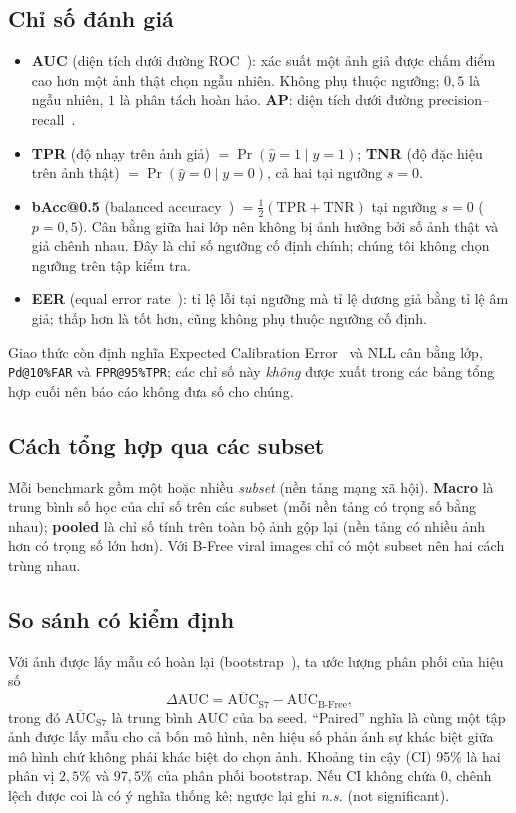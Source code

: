 \documentclass[11pt,a4paper]{article}
\begin{document}
\subsection{Chỉ số đánh giá}
\begin{itemize}
  \item \textbf{AUC} (diện tích dưới đường ROC~\cite{hanley1982meaning}): xác suất một ảnh giả được chấm điểm cao hơn một ảnh thật chọn ngẫu nhiên. Không phụ thuộc ngưỡng; $0{,}5$ là ngẫu nhiên, $1$ là phân tách hoàn hảo. \textbf{AP}: diện tích dưới đường precision--recall~\cite{davis2006relationship}.
  \item \textbf{TPR} (độ nhạy trên ảnh giả) $=\Pr(\hat y=1\mid y=1)$; \textbf{TNR} (độ đặc hiệu trên ảnh thật) $=\Pr(\hat y=0\mid y=0)$, cả hai tại ngưỡng $s=0$.
  \item \textbf{bAcc@0.5} (balanced accuracy~\cite{brodersen2010balanced}) $=\tfrac12(\text{TPR}+\text{TNR})$ tại ngưỡng $s=0$ ($p=0{,}5$). Cân bằng giữa hai lớp nên không bị ảnh hưởng bởi số ảnh thật và giả chênh nhau. Đây là chỉ số ngưỡng cố định chính; chúng tôi không chọn ngưỡng trên tập kiểm tra.
  \item \textbf{EER} (equal error rate~\cite{ross2003information}): tỉ lệ lỗi tại ngưỡng mà tỉ lệ dương giả bằng tỉ lệ âm giả; thấp hơn là tốt hơn, cũng không phụ thuộc ngưỡng cố định.
\end{itemize}
Giao thức còn định nghĩa Expected Calibration Error~\cite{guo2017calibration} và NLL cân bằng lớp, \texttt{Pd@10\%FAR} và \texttt{FPR@95\%TPR}; các chỉ số này \emph{không} được xuất trong các bảng tổng hợp cuối nên báo cáo không đưa số cho chúng.

\subsection{Cách tổng hợp qua các subset}
Mỗi benchmark gồm một hoặc nhiều \emph{subset} (nền tảng mạng xã hội). \textbf{Macro} là trung bình số học của chỉ số trên các subset (mỗi nền tảng có trọng số bằng nhau); \textbf{pooled} là chỉ số tính trên toàn bộ ảnh gộp lại (nền tảng có nhiều ảnh hơn có trọng số lớn hơn). Với B-Free viral images chỉ có một subset nên hai cách trùng nhau.

\subsection{So sánh có kiểm định}
Với ảnh được lấy mẫu có hoàn lại (bootstrap~\cite{efron1986bootstrap}), ta ước lượng phân phối của hiệu số
\begin{equation}
\Delta\text{AUC}=\overline{\text{AUC}}_{\text{S7}}-\text{AUC}_{\text{B-Free}},
\end{equation}
trong đó $\overline{\text{AUC}}_{\text{S7}}$ là trung bình AUC của ba seed. ``Paired'' nghĩa là cùng một tập ảnh được lấy mẫu cho cả bốn mô hình, nên hiệu số phản ánh sự khác biệt giữa mô hình chứ không phải khác biệt do chọn ảnh. Khoảng tin cậy (CI) 95\% là hai phân vị $2{,}5\%$ và $97{,}5\%$ của phân phối bootstrap. Nếu CI không chứa $0$, chênh lệch được coi là có ý nghĩa thống kê; ngược lại ghi \emph{n.s.} (not significant).
\end{document}
